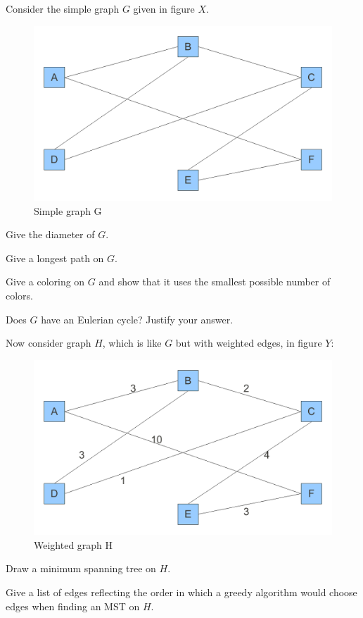 \documentclass[12pt,oneside]{article}
\begin{document}
\begin{problem}[20]

Consider the simple graph $G$ given in figure $X$.

\begin{figure}[h]
\caption{Simple graph G}
\begin{center}\includegraphics[width=12cm]{unweightedGraph.pdf}\end{center}
\end{figure}

\bparts

Give the diameter of $G$.

Give a longest path on $G$.

Give a coloring on $G$ and show that it uses the smallest possible number of colors.

Does $G$ have an Eulerian cycle?  Justify your answer.

\eparts

Now consider graph $H$, which is like $G$ but with weighted edges, in figure $Y$:

\begin{figure}[h]
\caption{Weighted graph H}
\begin{center}\includegraphics[width=12cm]{weightedGraph.pdf}\end{center}
\end{figure}

\bparts

Draw a minimum spanning tree on $H$.

Give a list of edges reflecting the order in which a greedy algorithm would choose edges when finding an MST on $H$.

\eparts
\end{problem}
\end{document}
